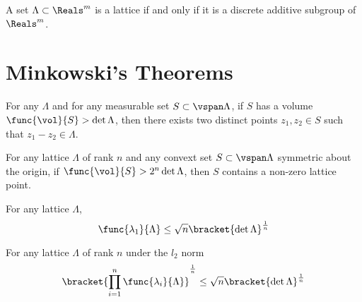 \begin{theorem}
    A set \(\Lambda \subset \Reals^m\) is a lattice if and only if it is a discrete additive subgroup of \(\Reals^m\).
\end{theorem}
\section{Minkowski's Theorems}
\begin{theorem}
    For any \(\Lambda\) and for any measurable set \(S \subset \vspan \Lambda\), if \(S\) has a volume \(\func{\vol}{S} > \det \Lambda\), then there exists two distinct points \(z_1,z_2 \in S\) such that \(z_1 - z_2 \in \Lambda\).    
\end{theorem}

\begin{theorem}
    For any lattice \(\Lambda\) of rank \(n\) and any convext set \(S \subset \vspan \Lambda\) symmetric about the origin, if \(\func{\vol}{S} > 2^n \det\Lambda\), then \(S\) contains a non-zero lattice point.    
\end{theorem}

\begin{theorem}
    For any lattice \(\Lambda\),
    \begin{equation*}
        \func{\lambda_1}{\Lambda} \leq \sqrt{n} \bracket{\det \Lambda}^{\frac{1}{n}}
    \end{equation*}
\end{theorem}

\begin{theorem}
    For any lattice \(\Lambda\) of rank \(n\) under the \(l_2\) norm
    \begin{equation*}
        \bracket{\prod_{i=1}^n\func{\lambda_i}{\Lambda}}^{\frac{1}{n}} \leq \sqrt{n} \bracket{\det \Lambda}^{\frac{1}{n}}
    \end{equation*}
\end{theorem}